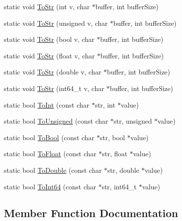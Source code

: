 \begin{DoxyCompactItemize}
\item 
static void \hyperlink{classtinyxml2_1_1_x_m_l_util_a3cd6c703d49b9d51bdf0f4ff6aa021c7}{To\+Str} (int v, char $\ast$buffer, int buffer\+Size)
\item 
static void \hyperlink{classtinyxml2_1_1_x_m_l_util_ac00c2e52c1c36dab3ff41d86a9bf60f9}{To\+Str} (unsigned v, char $\ast$buffer, int buffer\+Size)
\item 
static void \hyperlink{classtinyxml2_1_1_x_m_l_util_adba0718527ae9e80f663a71ea325cb11}{To\+Str} (bool v, char $\ast$buffer, int buffer\+Size)
\item 
static void \hyperlink{classtinyxml2_1_1_x_m_l_util_a8957ad44fee5fa02ba52d73aad4d0a31}{To\+Str} (float v, char $\ast$buffer, int buffer\+Size)
\item 
static void \hyperlink{classtinyxml2_1_1_x_m_l_util_a1cd141e50980fcddd6bf9af5de4b1db7}{To\+Str} (double v, char $\ast$buffer, int buffer\+Size)
\item 
static void \hyperlink{classtinyxml2_1_1_x_m_l_util_a26a8cb5b833ad587b3af39469c8111de}{To\+Str} (int64\+\_\+t v, char $\ast$buffer, int buffer\+Size)
\item 
static bool \hyperlink{classtinyxml2_1_1_x_m_l_util_ad4df4023d11ee3fca9689c49b9707323}{To\+Int} (const char $\ast$str, int $\ast$value)
\item 
static bool \hyperlink{classtinyxml2_1_1_x_m_l_util_a210c8637d5eb4ce3d4625294af0efc2f}{To\+Unsigned} (const char $\ast$str, unsigned $\ast$value)
\item 
static bool \hyperlink{classtinyxml2_1_1_x_m_l_util_ae5b03e0a1ca5d42052a7ac540f7aa12a}{To\+Bool} (const char $\ast$str, bool $\ast$value)
\item 
static bool \hyperlink{classtinyxml2_1_1_x_m_l_util_a399e71edb5f29d61ea81d91ee0332bb9}{To\+Float} (const char $\ast$str, float $\ast$value)
\item 
static bool \hyperlink{classtinyxml2_1_1_x_m_l_util_ad8f75ac140fb19c1c6e164a957c4cd53}{To\+Double} (const char $\ast$str, double $\ast$value)
\item 
static bool \hyperlink{classtinyxml2_1_1_x_m_l_util_afe2ea09257431cd2b4b6d440552e4195}{To\+Int64} (const char $\ast$str, int64\+\_\+t $\ast$value)
\end{DoxyCompactItemize}


\subsection{Member Function Documentation}
\mbox{\label{classtinyxml2_1_1_x_m_l_util_a31c00d5c5dfb38382de1dfcaf4be3595}} 
